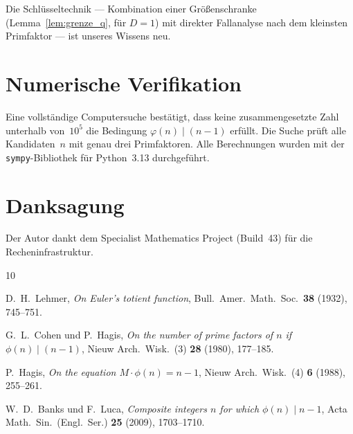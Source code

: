 \documentclass[12pt,a4paper]{amsart}
\theoremstyle{definition}
\newcommand{\euler}{\varphi}
\begin{document}
Die Schlüsseltechnik — Kombination einer Größenschranke (Lemma~\ref{lem:grenze_q}, für $D=1$)
mit direkter Fallanalyse nach dem kleinsten Primfaktor — ist unseres Wissens neu.

\section{Numerische Verifikation}

Eine vollständige Computersuche bestätigt, dass keine zusammengesetzte Zahl
unterhalb von~$10^5$ die Bedingung $\euler(n) \mid (n-1)$ erfüllt.
Die Suche prüft alle Kandidaten~$n$ mit genau drei Primfaktoren.
Alle Berechnungen wurden mit der \texttt{sympy}-Bibliothek für Python~3.13
durchgeführt.

\section*{Danksagung}

Der Autor dankt dem Specialist Mathematics Project (Build~43) für die
Recheninfrastruktur.

\begin{thebibliography}{10}

D.~H.~Lehmer,
\emph{On Euler's totient function},
Bull.\ Amer.\ Math.\ Soc.\ \textbf{38} (1932), 745--751.

G.~L.~Cohen und P.~Hagis,
\emph{On the number of prime factors of $n$ if $\phi(n) \mid (n-1)$},
Nieuw Arch.\ Wisk.\ (3) \textbf{28} (1980), 177--185.

P.~Hagis,
\emph{On the equation $M \cdot \phi(n) = n - 1$},
Nieuw Arch.\ Wisk.\ (4) \textbf{6} (1988), 255--261.

W.~D.~Banks und F.~Luca,
\emph{Composite integers $n$ for which $\phi(n) \mid n - 1$},
Acta Math.\ Sin.\ (Engl.\ Ser.) \textbf{25} (2009), 1703--1710.

\end{thebibliography}
\end{document}
